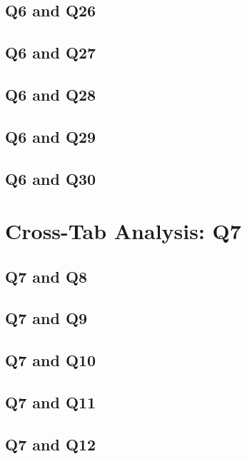 \documentclass{report}
\begin{document}
\clearpage
\section{Q6 and Q26}


\clearpage
\section{Q6 and Q27}


\clearpage
\section{Q6 and Q28}


\clearpage
\section{Q6 and Q29}


\clearpage
\section{Q6 and Q30}


\chapter{Cross-Tab Analysis: Q7}
\section{Q7 and Q8}


\clearpage
\section{Q7 and Q9}


\clearpage
\section{Q7 and Q10}


\clearpage
\section{Q7 and Q11}


\clearpage
\section{Q7 and Q12}

\end{document}
